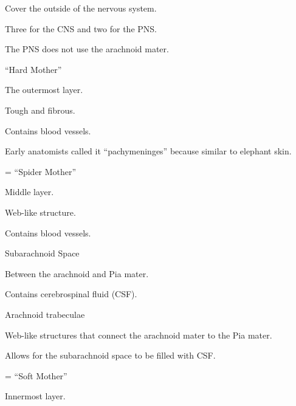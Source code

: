 \begin{coloredlist}
    \item Cover the outside of the nervous system.
    \begin{coloredlist}
        \item Three for the CNS and two for the PNS.
        \item The PNS does not use the arachnoid mater.
    \end{coloredlist}
    \item {}
    \begin{coloredlist}
        \item ``Hard Mother''
        \item The outermost layer.
        \item Tough and fibrous.
        \item Contains blood vessels.
        \item Early anatomists called it ``pachymeninges'' because similar to elephant skin.
    \end{coloredlist}
    \item {} = ``Spider Mother''
    \begin{coloredlist}
        \item Middle layer.
        \item Web-like structure.
        \item Contains blood vessels.
        \item Subarachnoid Space
        \begin{coloredlist}
            \item Between the arachnoid and Pia mater.
            \item Contains cerebrospinal fluid (CSF).
        \end{coloredlist}
        \item Arachnoid trabeculae
        \begin{coloredlist}
            \item Web-like structures that connect the arachnoid mater to the Pia mater.
            \item Allows for the subarachnoid space to be filled with CSF.
        \end{coloredlist}
    \end{coloredlist}
    \item {} = ``Soft Mother''
    \begin{coloredlist}
        \item Innermost layer.

\end{coloredlist}
\end{coloredlist}
